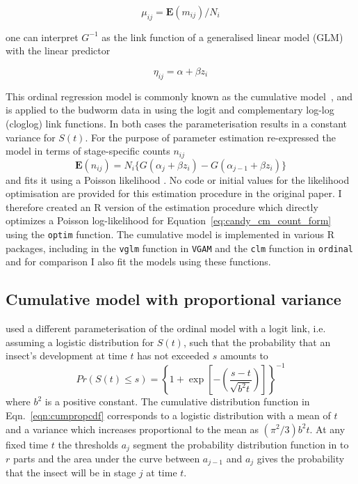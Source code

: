 $$\mu_{ij} = \mathbf{E}(m_{ij})/N_i$$

 one can interpret $G^{-1}$ as the link function of a generalised linear model (GLM) with the linear predictor 

$$\eta_{ij}=\alpha+\beta z_i$$

This ordinal regression model is commonly known as the cumulative model~\citep{burkner2019ordinal}, and is applied to the budworm data in \citep{candy1991modeling} using the logit and complementary log-log (cloglog) link functions. 
In both cases the parameterisation results in a constant variance for $S(t)$.
For the purpose of parameter estimation \citet{candy1991modeling} re-expressed the model in terms of stage-specific counts $n_{ij}$  
\begin{equation}
\mathbf{E}(n_{ij})=N_i\{G(\alpha_j + \beta z_i) - G(\alpha_{j-1} + \beta z_i)\}
\label{eq:candy_cm_count_form}
\end{equation}
and fits it using a Poisson likelihood \citep{thompson1981composite}. 
No code or initial values for the likelihood optimisation are provided for this estimation procedure in the original paper.   
I therefore created an R version of the estimation procedure which directly optimizes a Poisson log-likelihood for Equation~\ref{eq:candy_cm_count_form} using the \verb+optim+ function.
 The cumulative model is implemented in various R packages, including in the \verb+vglm+ function in \verb+VGAM+ \citep{VGAM} and the \verb+clm+ function in \verb+ordinal+ \cite{ordinal} and for comparison I also fit the models using these functions.

\subsection{Cumulative model with proportional variance}
\citet{dennis1986stochastic} used a different parameterisation of the ordinal model with a logit link, i.e. assuming a logistic distribution for $S(t)$, such that the probability that an insect's development at time $t$ has not exceeded $s$ amounts to 
\begin{equation}
Pr(S(t) \leq s) = \left\{ 1 + \exp\left[-\left(\frac{s-t}{\sqrt{b^2t}}\right)\right]\right\}^{-1}
\label{eqn:cumpropcdf}
\end{equation}
where $b^2$ is a positive constant. 
The cumulative distribution function in Eqn.~\ref{eqn:cumpropcdf} corresponds to a logistic distribution with a mean of $t$ and a variance which increases proportional to the mean as $(\pi^2/3)b^2t$.
At any fixed time $t$ the thresholds $a_j$ segment the probability distribution function in to $r$ parts and the area under the curve between $a_{j-1}$ and $a_j$ gives the probability that the insect will be in stage $j$ at time $t$.

